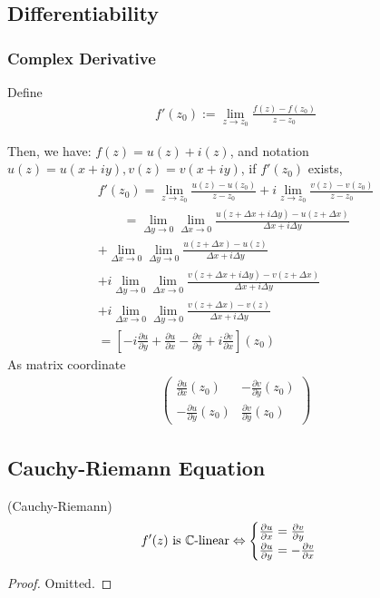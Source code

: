 \documentclass[Total.tex]{subfiles}
\begin{document}
			\subsection{Differentiability}
				\subsubsection{Complex Derivative}
					\begin{Def}
						Define
						\begin{gather*}
							f'(z_0):=\lim_{z\rightarrow z_0} \frac{f(z)-f(z_0)}{z-z_0}
						\end{gather*}
					\end{Def}
					Then, we have: $f(z)=u(z)+i(z)$, and notation $u(z)=u(x+iy),v(z)=v(x+iy)$, if $f'(z_0)$ exists,
					\begin{gather*}
						f'(z_0)=\lim_{z\rightarrow z_0} \frac{u(z)-u(z_0)}{z-z_0}+i\lim_{z\rightarrow z_0} \frac{v(z)-v(z_0)}{z-z_0}\\
						\qquad=\lim_{\Delta y\rightarrow 0}\lim_{\Delta x\rightarrow 0} \frac{u(z+\Delta x+i\Delta y)-u(z+\Delta x)}{\Delta x+i\Delta y}\\+\lim_{\Delta x\rightarrow 0}\lim_{\Delta y\rightarrow 0}\frac{u(z+\Delta x)-u(z)}{\Delta x+i\Delta y}\\+i\lim_{\Delta y\rightarrow 0}\lim_{\Delta x\rightarrow 0} \frac{v(z+\Delta x+i\Delta y)-v(z+\Delta x)}{\Delta x+i\Delta y}\\+i\lim_{\Delta x\rightarrow 0}\lim_{\Delta y\rightarrow 0}\frac{v(z+\Delta x)-v(z)}{\Delta x+i\Delta y}\\
						=[-i\frac{\partial u}{\partial y}+\frac{\partial u}{\partial x}-\frac{\partial v}{\partial y}+i\frac{\partial v}{\partial x}](z_0)
					\end{gather*}
					As matrix coordinate
					\begin{gather*}
						\begin{pmatrix}
							\frac{\partial u}{\partial x}(z_0)&-\frac{\partial v}{\partial y}(z_0)\\
							-\frac{\partial u}{\partial y}(z_0)&\frac{\partial v}{\partial y}(z_0)
						\end{pmatrix}
					\end{gather*}
			\subsection{Cauchy-Riemann Equation}
				\begin{theorem}
					(Cauchy-Riemann) 
					\begin{gather*}
						f'(z)\mbox{ is }\mathbb{C}\mbox{-linear}\Leftrightarrow \begin{cases}
							\frac{\partial u}{\partial x}=\frac{\partial v}{\partial y}\\
							\frac{\partial u}{\partial y}=-\frac{\partial v}{\partial x}
						\end{cases}
					\end{gather*}
				\end{theorem}
				\begin{proof}
					Omitted.
				\end{proof}
\end{document}
